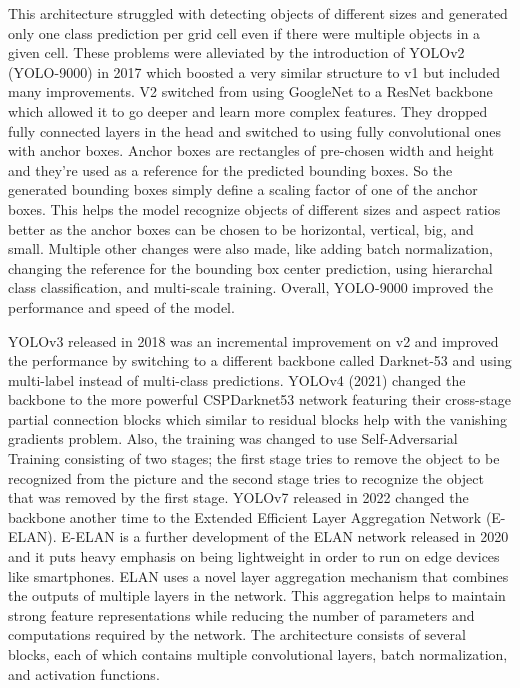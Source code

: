 This architecture struggled with detecting objects of different sizes and generated only one class prediction per grid cell even if there were multiple objects in a given cell. These problems were alleviated by the introduction of YOLOv2 (YOLO-9000) in 2017 \cite{redmon_yolo9000_2017} which boosted a very similar structure to v1 but included many improvements. V2 switched from using GoogleNet to a ResNet backbone \cite{he_deep_2016} which allowed it to go deeper and learn more complex features. They dropped fully connected layers in the head and switched to using fully convolutional ones with anchor boxes. Anchor boxes are rectangles of pre-chosen width and height and they're used as a reference for the predicted bounding boxes. So the generated bounding boxes simply define a scaling factor of one of the anchor boxes. This helps the model recognize objects of different sizes and aspect ratios better as the anchor boxes can be chosen to be horizontal, vertical, big, and small. Multiple other changes were also made, like adding batch normalization, changing the reference for the bounding box center prediction, using hierarchal class classification, and multi-scale training. Overall, YOLO-9000 improved the performance and speed of the model.

YOLOv3 \cite{redmon_yolov3_2018} released in 2018 was an incremental improvement on v2 and improved the performance by switching to a different backbone called Darknet-53 and using multi-label instead of multi-class predictions. YOLOv4 \cite{wang_scaled-yolov4_2021} (2021) changed the backbone to the more powerful CSPDarknet53 network featuring their cross-stage partial connection blocks which similar to residual blocks help with the vanishing gradients problem. Also, the training was changed to use Self-Adversarial Training consisting of two stages; the first stage tries to remove the object to be recognized from the picture and the second stage tries to recognize the object that was removed by the first stage. YOLOv7 \cite{wang_yolov7_2022} released in 2022 changed the backbone another time to the Extended Efficient Layer Aggregation Network (E-ELAN). E-ELAN is a further development of the ELAN network released in 2020 and it puts heavy emphasis on being lightweight in order to run on edge devices like smartphones. ELAN uses a novel layer aggregation mechanism that combines the outputs of multiple layers in the network. This aggregation helps to maintain strong feature representations while reducing the number of parameters and computations required by the network. The architecture consists of several blocks, each of which contains multiple convolutional layers, batch normalization, and activation functions.

